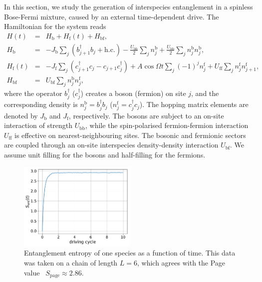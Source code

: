 \documentclass{SciPost}
\newcommand\0{\scalebox{-1}[1]{0}}
\begin{document}
In this section, we study the generation of interspecies entanglement in a spinless Bose-Fermi mixture, caused by an external time-dependent drive. The Hamiltonian for the system reads
\begin{eqnarray}
\label{eq:H_BFM}
H(t) &=& H_\mathrm{b} + H_\mathrm{f}(t) + H_\mathrm{bf},\nonumber\\
H_\mathrm{b} &=& -J_\mathrm{b}\sum_{j}\left(b^\dagger_{j+1}b_j + \mathrm{h.c.}\right) - \frac{U_\mathrm{bb}}{2}\sum_j n^\mathrm{b}_j + \frac{U_\mathrm{bb}}{2}\sum_j n^\mathrm{b}_jn^\mathrm{b}_j,\nonumber\\
H_\mathrm{f}(t) &=& -J_\mathrm{f}\sum_{j}\left(c^\dagger_{j+1}c_j - c_{j+1}c^\dagger_j\right) + A\cos\Omega t\sum_j (-1)^j n^\mathrm{f}_j +  U_\mathrm{ff}\sum_j n^\mathrm{f}_jn^\mathrm{f}_{j+1},\nonumber\\
H_\mathrm{bf} &=& U_\mathrm{bf}\sum_j n^\mathrm{b}_jn^\mathrm{f}_j,
\end{eqnarray} 
where the operator $b^\dagger_j$ ($c^\dagger_j$) creates a boson (fermion) on site $j$, and the corresponding density is $n^\mathrm{b}_j=b^\dagger_jb_j$ ($n^\mathrm{f}_j=c^\dagger_jc_j$). The hopping matrix elements are denoted by $J_\mathrm{b}$ and $J_\mathrm{f}$, respectively. The bosons are subject to an on-site interaction of strength $U_\mathrm{bb}$, while the spin-polarised fermion-fermion interaction $U_\mathrm{ff}$ is effective on nearest-neighbouring sites. The bosonic and fermionic sectors are coupled through an on-site interspecies density-density interaction $U_\mathrm{bf}$. We assume unit filling for the bosons and half-filling for the fermions.

\begin{figure}[t!]
	\centering
	\includegraphics[width=0.5\textwidth]{BFM.pdf}
	\caption{\label{fig:BFM} Entanglement entropy of one species as a function of time. This data was taken on a chain of length $L=6$, which agrees with the Page value~\cite{page_93} $S_\mathrm{page}\approx2.86$.}
\end{figure}
\end{document}
